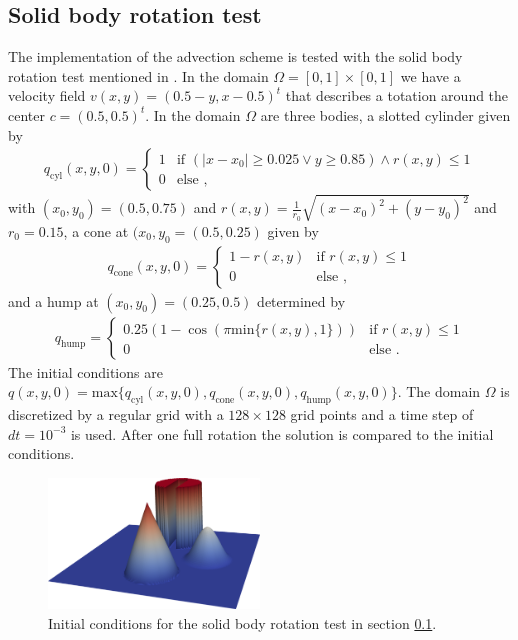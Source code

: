 \subsection{Solid body rotation test}\label{ss:sbrt}
The implementation of the advection scheme is tested with the solid body rotation test mentioned in .
In the domain $\Omega=[0,1]\times[0,1]$ we have a velocity field $v(x,y)=(0.5-y,x-0.5)^t$ that describes a totation around the center $c=(0.5,0.5)^t$.
In the domain $\Omega$ are three bodies, a slotted cylinder given by 
\begin{align}
q_{\text{cyl}}(x,y,0) = \begin{cases} 1 &\mbox{if } (|x-x_0| \geq 0.025 \vee y \geq 0.85) \wedge r(x,y) \leq 1 \\
0 & \mbox{else }, \end{cases}
\end{align} 
with $(x_0,y_0) = (0.5,0.75)$ and $r(x,y)= \frac{1}{r_0}\sqrt{(x-x_0)^2 +(y-y_0)^2}$ and $r_0 = 0.15$, 
a cone at $(x_0,y_0 = (0.5,0.25)$ given by 
\begin{align}
q_{\text{cone}}(x,y,0) = \begin{cases} 1 - r(x,y) &\mbox{if }  r(x,y) \leq 1 \\
                               0 & \mbox{else }, \end{cases}
\end{align}
and a hump at $(x_0,y_0) = (0.25,0.5)$ determined by
\begin{align}
q_{\text{hump}} = \begin{cases} 0.25(1-\cos(\pi\text{min}\{r(x,y),1\})) &\mbox{if }  r(x,y) \leq 1 \\
                               0 & \mbox{else }. \end{cases}
\end{align}
The initial conditions are $q(x,y,0) = \text{max}\{q_{\text{cyl}}(x,y,0),q_{\text{cone}}(x,y,0),q_{\text{hump}}(x,y,0)\}$. The domain $\Omega$ is discretized by a regular grid with a $128 \times 128$ grid points and a time step of $dt = 10^{-3}$ is used. After one full rotation the solution is compared to the initial conditions. 
\begin{figure}
     \centering  
    \includegraphics[width= 0.5\textwidth]{Figures/solidbodyrotinit.png}
    \caption{%
        Initial conditions for the solid body rotation test in section \ref{ss:sbrt}.
        }%
   \label{fig:sbrotinit}
\end{figure}
  

